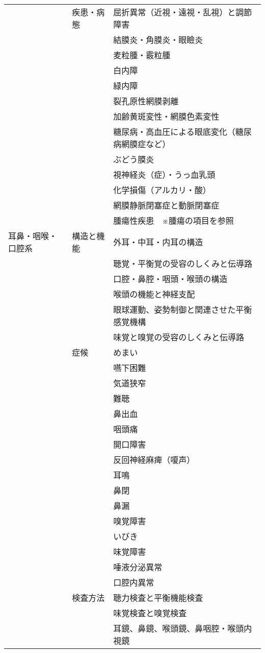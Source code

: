\begin{xltabular}{\linewidth}{XXX}
 & 疾患・病態 & 屈折異常（近視・遠視・乱視）と調節障害 \\
 &  & 結膜炎・角膜炎・眼瞼炎 \\
 &  & 麦粒腫・霰粒腫 \\
 &  & 白内障 \\
 &  & 緑内障 \\
 &  & 裂孔原性網膜剥離 \\
 &  & 加齢黄斑変性・網膜色素変性 \\
 &  & 糖尿病・高血圧による眼底変化（糖尿病網膜症など） \\
 &  & ぶどう膜炎 \\
 &  & 視神経炎（症）・うっ血乳頭 \\
 &  & 化学損傷（アルカリ・酸） \\
 &  & 網膜静脈閉塞症と動脈閉塞症 \\
 &  & 腫瘍性疾患　※腫瘍の項目を参照 \\
耳鼻・咽喉・口腔系 & 構造と機能 & 外耳・中耳・内耳の構造 \\
 &  & 聴覚・平衡覚の受容のしくみと伝導路 \\
 &  & 口腔・鼻腔・咽頭・喉頭の構造 \\
 &  & 喉頭の機能と神経支配 \\
 &  & 眼球運動、姿勢制御と関連させた平衡感覚機構 \\
 &  & 味覚と嗅覚の受容のしくみと伝導路 \\
 & 症候 & めまい \\
 &  & 嚥下困難 \\
 &  & 気道狭窄 \\
 &  & 難聴 \\
 &  & 鼻出血 \\
 &  & 咽頭痛 \\
 &  & 開口障害 \\
 &  & 反回神経麻痺（嗄声） \\
 &  & 耳鳴 \\
 &  & 鼻閉 \\
 &  & 鼻漏 \\
 &  & 嗅覚障害 \\
 &  & いびき \\
 &  & 味覚障害 \\
 &  & 唾液分泌異常 \\
 &  & 口腔内異常 \\
 & 検査方法 & 聴力検査と平衡機能検査 \\
 &  & 味覚検査と嗅覚検査 \\
 &  & 耳鏡、鼻鏡、喉頭鏡、鼻咽腔・喉頭内視鏡 \\

\end{xltabular}
